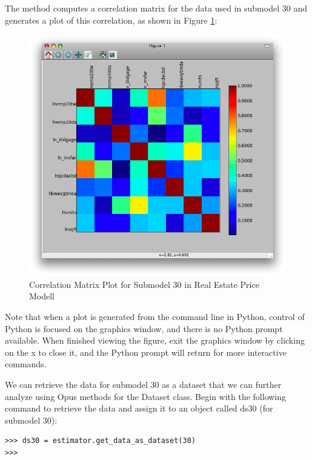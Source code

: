 The method computes a correlation matrix for the data used in submodel 30 and generates a plot of this correlation, as shown in Figure \ref{fig:correlation30}:

\begin{figure}[htp]
\begin{center}
\includegraphics[scale=0.35]{graphics/correlation30.png}
\end{center}
\caption{Correlation Matrix Plot for Submodel 30 in Real Estate Price Modell}
\label{fig:correlation30}
\end{figure}

Note that when a plot is generated from the command line in Python, control of Python is focused on the graphics window, and there is no Python prompt available.  When finished viewing the figure, exit the graphics window by clicking on the x to close it, and the Python prompt will return for more interactive commands.

We can retrieve the data for submodel 30 as a dataset that we can further analyze using Opus methods for the Dataset class.  Begin with the following command to retrieve the data and assign it to an object called ds30 (for submodel 30):

\begin{lstlisting}
>>> ds30 = estimator.get_data_as_dataset(30)
>>>
\end{lstlisting}

